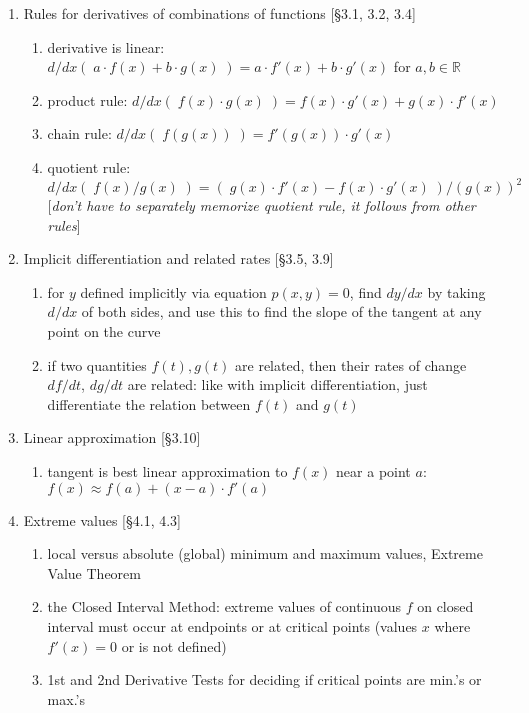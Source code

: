 \documentclass[11pt]{article}
\begin{document}
\begin{enumerate}
\item Rules for derivatives of combinations of functions [\S 3.1, 3.2, 3.4]
\begin{enumerate}
\item derivative is linear: $d/dx( \; a\cdot f(x) + b\cdot g(x) \;) = a \cdot f'(x) + b \cdot g'(x)$ for $a,b \in \mathbb{R}$
\item product rule: $d/dx( \; f(x)\cdot g(x) \;) = f(x) \cdot g'(x) + g(x) \cdot f'(x)$
\item chain rule: $d/dx (\; f(g(x)) \; ) = f'(g(x)) \cdot g'(x)$
\item quotient rule: $\displaystyle d/dx (\; f(x)/g(x) \;) = (\; g(x)\cdot f'(x) - f(x)\cdot g'(x) \; )/(g(x))^2$\\ {[\emph{don't have to separately memorize quotient rule, it follows from other rules}]}
\end{enumerate}

\item Implicit differentiation and related rates [\S 3.5, 3.9]
\begin{enumerate}
\item for $y$ defined implicitly via equation $p(x,y)=0$, find $dy/dx$ by taking $d/dx$ of both sides, and use this to find the slope of the tangent at any point on the curve
\item if two quantities $f(t), g(t)$ are related, then their rates of change $df/dt$, $dg/dt$ are related: like with implicit differentiation, just differentiate the relation between $f(t)$ and $g(t)$
\end{enumerate}

\item Linear approximation [\S 3.10]
\begin{enumerate}
\item tangent is best linear approximation to $f(x)$ near a point $a$: $f(x) \approx f(a) + (x-a) \cdot f'(a)$
\end{enumerate}

\item Extreme values [\S 4.1, 4.3]
\begin{enumerate}
\item local versus absolute (global) minimum and maximum values, Extreme Value Theorem
\item the Closed Interval Method: extreme values of continuous $f$ on closed interval must occur at endpoints or at critical points (values $x$ where $f'(x)=0$ or is not defined)
\item 1st and 2nd Derivative Tests for deciding if critical points are min.'s or max.'s
\end{enumerate}


\end{enumerate}
\end{document}
